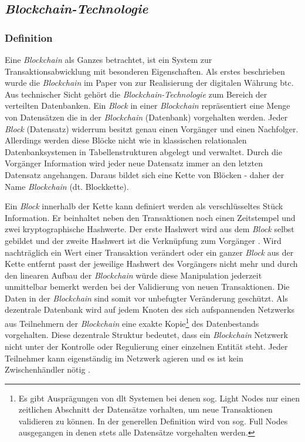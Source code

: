 \subsection{\textit{Blockchain-Technologie}}

\subsubsection{Definition} \label{blockchain-definition}
Eine \textit{Blockchain} als Ganzes betrachtet, ist ein System zur Transaktionsabwicklung mit besonderen Eigenschaften. Als erstes beschrieben wurde die \textit{Blockchain} im Paper von \cite{Nakamoto2009} zur Realisierung der digitalen Währung \ac{btc}. Aus technischer Sicht gehört die \textit{Blockchain-Technologie} zum Bereich der verteilten Datenbanken. Ein \textit{Block} in einer \textit{Blockchain} repräsentiert eine Menge von Datensätzen die in der \textit{Blockchain} (Datenbank) vorgehalten werden. Jeder \textit{Block} (Datensatz) widerrum besitzt genau einen Vorgänger und einen Nachfolger. Allerdings werden diese Blöcke nicht wie in klassischen relationalen Datenbanksystemen in Tabellenstrukturen abgelegt und verwaltet. Durch die Vorgänger Information wird jeder neue Datensatz immer an den letzten Datensatz angehangen. Daraus bildet sich eine Kette von Blöcken - daher der Name \textit{Blockchain} (dt. Blockkette).

Ein \textit{Block} innerhalb der Kette kann definiert werden als verschlüsseltes Stück Information. Er beinhaltet neben den Transaktionen noch einen Zeitstempel und zwei kryptographische Hashwerte. Der erste Hashwert wird aus dem \textit{Block} selbst gebildet und der zweite Hashwert ist die Verknüpfung zum Vorgänger \citep{Tschorsch2016}. Wird nachträglich ein Wert einer Transaktion verändert oder ein ganzer \textit{Block} aus der Kette entfernt passt der jeweilige Hashwert des Vorgängers nicht mehr und durch den linearen Aufbau der \textit{Blockchain} würde diese Manipulation jederzeit unmittelbar bemerkt werden bei der Validierung von neuen Transaktionen. Die Daten in der \textit{Blockchain} sind somit vor unbefugter Veränderung geschützt. Als dezentrale Datenbank wird auf jedem Knoten des sich aufspannenden Netzwerks aus Teilnehmern der \textit{Blockchain} eine exakte Kopie\footnote{Es gibt Ausprägungen von \ac{dlt} Systemen bei denen sog. Light Nodes nur einen zeitlichen Abschnitt der Datensätze vorhalten, um neue Transaktionen validieren zu können. In der generellen Definition wird von sog. Full Nodes ausgegangen in denen stets alle Datensätze vorgehalten werden.} des Datenbestands vorgehalten. Diese dezentrale Struktur bedeutet, dass ein \textit{Blockchain} Netzwerk nicht unter der Kontrolle oder Regulierung einer einzelnen Entität steht. Jeder Teilnehmer kann eigenständig im Netzwerk agieren und es ist kein Zwischenhändler nötig \citep{Drescher2017, Meier2018}.

